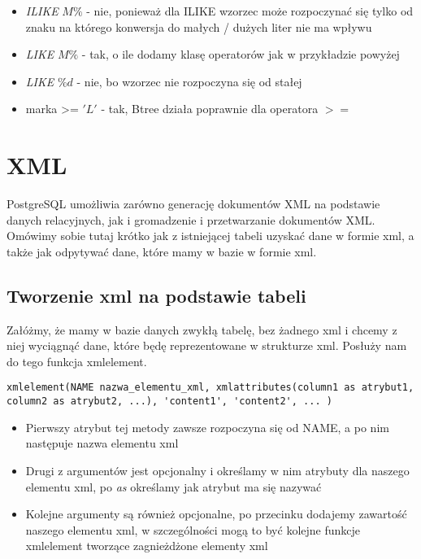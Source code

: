 \documentclass[a4paper,15pt]{article}
\begin{document}
\begin{itemize}
\item \textit{ILIKE} $M\%$ - nie, ponieważ dla ILIKE wzorzec może rozpoczynać się tylko od znaku na którego konwersja do małych / dużych liter nie ma wpływu
\item \textit{LIKE} $M\%$ - tak, o ile dodamy klasę operatorów jak w przykładzie powyżej
\item \textit{LIKE} $\%d$ - nie, bo wzorzec nie rozpoczyna się od stałej
\item marka >= $'L'$ - tak, Btree działa poprawnie dla operatora $>=$
\end{itemize}


\newpage
\section{XML}

PostgreSQL umożliwia zarówno generację dokumentów XML na podstawie danych relacyjnych, jak i gromadzenie i przetwarzanie dokumentów XML. Omówimy sobie tutaj krótko jak z istniejącej tabeli uzyskać dane w formie xml, a także jak odpytywać dane, które mamy w bazie w formie xml. 

\subsection{Tworzenie xml na podstawie tabeli}
Załóżmy, że mamy w bazie danych zwykłą tabelę, bez żadnego xml i chcemy z niej wyciągnąć dane, które będę reprezentowane w strukturze xml. Posłuży nam do tego funkcja xmlelement. 

\begin{lstlisting}
xmlelement(NAME nazwa_elementu_xml, xmlattributes(column1 as atrybut1, column2 as atrybut2, ...), 'content1', 'content2', ... )
\end{lstlisting}

\begin{itemize}
\item Pierwszy atrybut tej metody zawsze rozpoczyna się od NAME, a po nim następuje nazwa elementu xml
\item Drugi z argumentów jest opcjonalny i określamy w nim atrybuty dla naszego elementu xml, po \textit{as} określamy jak atrybut ma się nazywać
\item Kolejne argumenty są również opcjonalne, po przecinku dodajemy zawartość naszego elementu xml, w szczególności mogą to być kolejne funkcje xmlelement tworzące zagnieżdżone elementy xml
\end{itemize}
 
\end{document}
